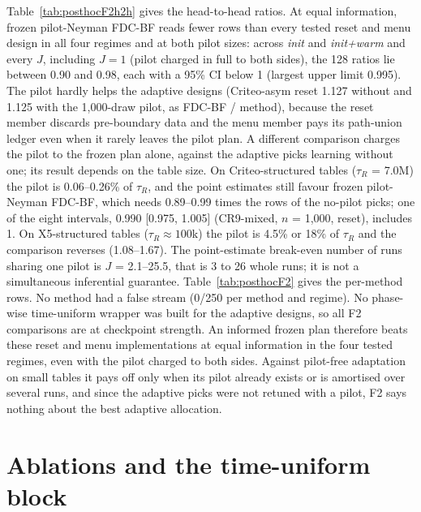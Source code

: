 \documentclass[sigconf,anonymous,review]{acmart}
\begin{document}
Table~\ref{tab:posthocF2h2h} gives the head-to-head ratios. At equal information, frozen pilot-Neyman FDC-BF reads fewer rows than every tested reset and menu design in all four regimes and at both pilot sizes: across \emph{init} and \emph{init+warm} and every $J$, including $J = 1$ (pilot charged in full to both sides), the 128 ratios lie between 0.90 and 0.98, each with a 95\% CI below 1 (largest upper limit 0.995). The pilot hardly helps the adaptive designs (Criteo-asym reset 1.127 without and 1.125 with the 1,000-draw pilot, as FDC-BF / method), because the reset member discards pre-boundary data and the menu member pays its path-union ledger even when it rarely leaves the pilot plan. A different comparison charges the pilot to the frozen plan alone, against the adaptive picks learning without one; its result depends on the table size. On Criteo-structured tables ($\tau_R$ = 7.0M) the pilot is 0.06--0.26\% of $\tau_R$, and the point estimates still favour frozen pilot-Neyman FDC-BF, which needs 0.89--0.99 times the rows of the no-pilot picks; one of the eight intervals, 0.990 [0.975, 1.005] (CR9-mixed, $n$ = 1,000, reset), includes 1. On X5-structured tables ($\tau_R \approx 100$k) the pilot is 4.5\% or 18\% of $\tau_R$ and the comparison reverses (1.08--1.67). The point-estimate break-even number of runs sharing one pilot is $J$ = 2.1--25.5, that is 3 to 26 whole runs; it is not a simultaneous inferential guarantee. Table~\ref{tab:posthocF2} gives the per-method rows. No method had a false stream (0/250 per method and regime). No phase-wise time-uniform wrapper was built for the adaptive designs, so all F2 comparisons are at checkpoint strength. An informed frozen plan therefore beats these reset and menu implementations at equal information in the four tested regimes, even with the pilot charged to both sides. Against pilot-free adaptation on small tables it pays off only when its pilot already exists or is amortised over several runs, and since the adaptive picks were not retuned with a pilot, F2 says nothing about the best adaptive allocation.




\section{Ablations and the time-uniform block}\label{app:ablation}
\end{document}
